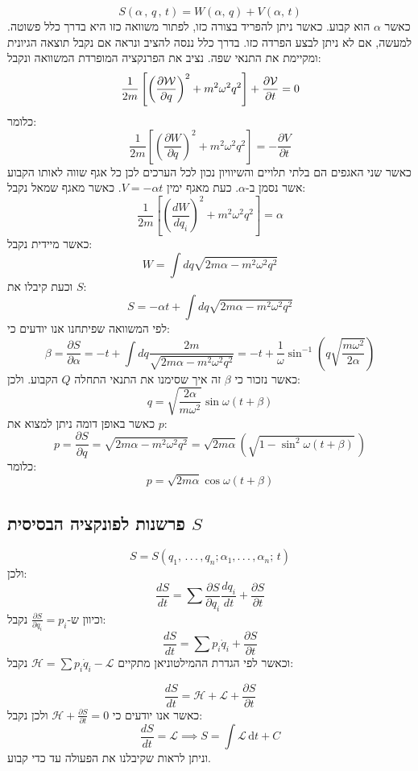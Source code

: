 \documentclass{tstextbook}
\begin{document}
$$S(\alpha\,,\,q\,,\,t)=W(\alpha,\,q)+V(\alpha,\,t)$$
כאשר \(\alpha\) הוא קבוע. כאשר ניתן להפריד בצורה כזו, לפתור משוואה כזו היא בדרך כלל פשוטה. למעשה, אם לא ניתן לבצע הפרדה כזו. בדרך כלל ננסה להציב ונראה אם נקבל תוצאה הגיונית ומקיימת את התנאי שפה. נציב את הפרנקציה המופרדת המשוואה ונקבל:
$$\frac{1}{2m}\left[\left(\frac{\partial{\cal W}}{\partial q}\right)^{2}+m^{2}\omega^{2}q^{2}\right]+\frac{\partial{\cal V}}{\partial t}=0$$
כלומר:
$${\frac{1}{2m}}\left[\left({\frac{\partial W}{\partial q}}\right)^{2}+m^{2}\omega^{2}q^{2}\right]=-{\frac{\partial V}{\partial t}}$$
כאשר שני האגפים הם בלתי תלויים והשיוויון נכון לכל הערכים לכן כל אגף שווה לאותו הקבוע אשר נסמן ב-\(\alpha\). כעת מאגף ימין \(V=-\alpha t\). כאשר מאגף שמאל נקבל:
$${\frac{1}{2m}}\left[\left({\frac{d W}{d q_{i}}}\right)^{2}+m^{2}\omega^{2}q^{2}\right]=\alpha$$
כאשר מיידית נקבל:
$$W=\int d q\sqrt{2m\alpha-m^{2}\omega^{2}q^{2}}$$
וכעת קיבלו את \(S\):
$$S=-\alpha t+\int d q\sqrt{2m\alpha-m^{2}\omega^{2}q^{2}}$$
לפי המשוואה שפיתחנו אנו יודעים כי:
$$\beta=\frac{\partial S}{\partial\alpha}=-t+\int d q\frac{2m}{\sqrt{2m\alpha-m^{2}\omega^{2}q^{2}}}=-t+\frac{1}{\omega}\sin^{-1}\left(q\sqrt{\frac{m\omega^{2}}{2\alpha}}\right)$$
כאשר נזכור כי \(\beta\) זה איך שסימנו את התנאי התחלה \(Q\) הקבוע. ולכן:
$$q={\sqrt{\frac{2\alpha}{m\omega^{2}}}}\sin\omega(t+\beta)$$
כאשר באופן דומה ניתן למצוא את \(p\):
$$p=\frac{\partial S}{\partial q}=\sqrt{2m\alpha-m^{2}\omega^{2}q^{2}}=\sqrt{2m\alpha}\left(\sqrt{1-\sin^{2}\omega(t+\beta)}\,\right)$$
כלומר:
$$p={\sqrt{2m\alpha}}\cos\omega(t+\beta)$$

\subsection{פרשנות לפונקציה הבסיסית \(S\)}

$$S=S(q_{1},\,.\,.\,.\,,q_{n};\alpha_{1},.\,.\,.\,,\alpha_{n};\,t)$$
ולכן:
$${\frac{d S}{d t}}=\sum{\frac{\partial S}{\partial q_{i}}}{\frac{d q_{i}}{d t}}+{\frac{\partial S}{\partial t}}$$
וכיוון ש-\(\frac{\partial S}{\partial q_{i}}=p_{i}\) נקבל:
$$\frac{d S}{d t}=\sum p_{i}{\dot{q}}_{i}+\frac{\partial S}{\partial t}$$
וכאשר לפי הגדרת ההמילטוניאן מתקיים \(\mathcal{\mathcal{H}}=\sum p_{i}\dot{q}_{i}-\mathcal{\mathcal{L}}\) נקבל:

$$\frac{d S}{d t}=\mathcal{H}+\mathcal{L}+\frac{\partial S}{\partial t}$$
כאשר אנו יודעים כי \(\mathcal{H}+\frac{\partial S}{\partial t}=0\) ולכן נקבל:
$$\frac{dS}{dt}=\mathcal{\mathcal{L}} \implies S=\int \mathcal{\mathcal{L}}   \, \mathrm{d}t +C  $$
וניתן לראות שקיבלנו את הפעולה עד כדי קבוע.
\end{document}
